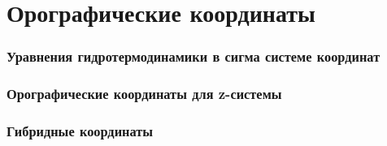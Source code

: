 \chapter{Орографические координаты}
    \lipsum[1-2]

\subsection{Уравнения гидротермодинамики в сигма системе координат}
    \lipsum[1-2]

\subsection{Орографические координаты для z-системы}
    \lipsum[1-2]

\subsection{Гибридные координаты}
    \lipsum[1-2]
